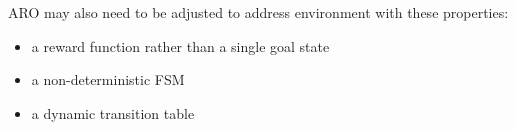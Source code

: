 \documentclass[letterpaper]{article} %
\begin{document}
ARO may also need to be adjusted to address environment with these
properties:
\begin{itemize}
\item a reward function rather than a single goal state
\item a non-deterministic FSM
\item a dynamic transition table
\end{itemize}

\begin{quote}
\begin{small}


\end{small}
\end{quote}
\end{document}

